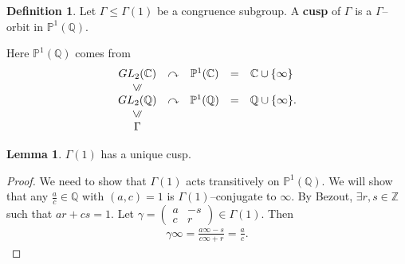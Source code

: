 \documentclass{article}
\theoremstyle{definition}
\newtheorem{lemma}[theorem]{Lemma}
\newtheorem{defn}{Definition}[section]
\begin{document}
\begin{defn}
    Let $\Gamma\le \Gamma(1)$ be a congruence subgroup. A \textbf{cusp} of $\Gamma$ is a $\Gamma$--orbit in $\mathbb{P}^1(\mathbb{Q})$.
\end{defn}
Here $\mathbb{P}^1(\mathbb{Q})$ comes from 
$$\begin{matrix} GL_2(\mathbb{C}) & \curvearrowright & \mathbb{P}^1(\mathbb{C}) & = & \mathbb{C} \cup \{\infty\} \\ \rotatebox[origin=c]{90}{$\leqslant $} & & &\\ GL_2(\mathbb{\mathbb{Q}}) & \curvearrowright & \mathbb{P}^1(\mathbb{\mathbb{Q}}) & = & \mathbb{Q} \cup \{\infty\} \\ \rotatebox[origin=c]{90}{$\leqslant $} & & & \\ \Gamma \end{matrix}.$$

\begin{lemma}
    $\Gamma(1)$ has a unique cusp.
\end{lemma}
\begin{proof}
    We need to show that $\Gamma(1)$ acts transitively on $\mathbb{P}^1(\mathbb{Q})$. We will show that any $\frac{a}{c} \in \mathbb{Q}$ with $(a,c)=1$ is $\Gamma(1)$--conjugate to $\infty$. By Bezout, $\exists r,s \in \mathbb{Z}$ such that $ar+cs=1$. Let $\gamma = \begin{pmatrix} a & -s \\ c & r \end{pmatrix} \in \Gamma(1)$. Then \begin{align*}
        \gamma \infty  = \frac{a \infty - s}{c \infty + r} = \frac{a}{c}.
    \end{align*}
\end{proof}
\end{document}
